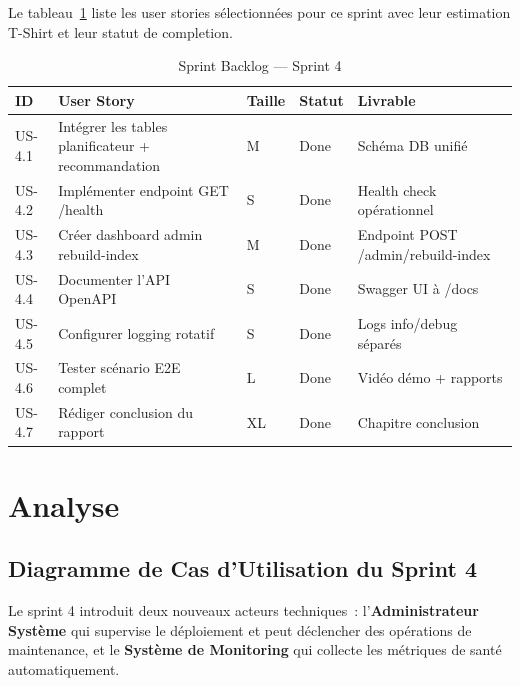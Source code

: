 Le tableau~\ref{tab:sprint4_backlog} liste les user stories sélectionnées pour ce sprint avec
leur estimation T-Shirt et leur statut de completion.

\begin{table}[H]
    \centering
    \caption{Sprint Backlog — Sprint 4}
    \label{tab:sprint4_backlog}
    \small
    \begin{tabular}{p{1cm} p{6cm} p{2cm} p{2cm} p{3cm}}
        \toprule
        \textbf{ID} & \textbf{User Story} & \textbf{Taille} & \textbf{Statut} & \textbf{Livrable} \\
        \midrule
        US-4.1 & Intégrer les tables planificateur + recommandation & M & Done & Schéma DB unifié \\
        US-4.2 & Implémenter endpoint GET /health & S & Done & Health check opérationnel \\
        US-4.3 & Créer dashboard admin rebuild-index & M & Done & Endpoint POST /admin/rebuild-index \\
        US-4.4 & Documenter l'API OpenAPI & S & Done & Swagger UI à /docs \\
        US-4.5 & Configurer logging rotatif & S & Done & Logs info/debug séparés \\
        US-4.6 & Tester scénario E2E complet & L & Done & Vidéo démo + rapports \\
        US-4.7 & Rédiger conclusion du rapport & XL & Done & Chapitre conclusion \\
        \bottomrule
    \end{tabular}
\end{table}


\section{Analyse}

\subsection{Diagramme de Cas d'Utilisation du Sprint 4}

Le sprint 4 introduit deux nouveaux acteurs techniques~: l'\textbf{Administrateur Système} qui
supervise le déploiement et peut déclencher des opérations de maintenance, et le \textbf{Système
de Monitoring} qui collecte les métriques de santé automatiquement.

